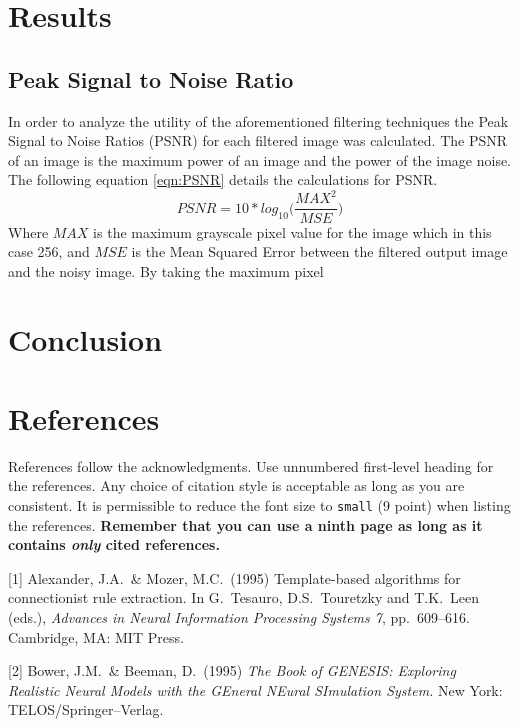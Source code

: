 \documentclass{article}
\begin{document}
\section{Results}
\subsection{Peak Signal to Noise Ratio}
In order to analyze the utility of the aforementioned filtering techniques the Peak Signal to Noise Ratios (PSNR) for each filtered image was calculated. The PSNR of an image is the maximum power of an image and the power of the image noise. The following equation \ref{eqn:PSNR} details the calculations for PSNR.
\begin{equation}\label{eqn:PSNR}
PSNR = 10*log_{10}\Big(\frac{MAX^2}{MSE}\Big)
\end{equation}	 
Where $MAX$ is the maximum grayscale pixel value for the image which in this case 256, and $MSE$ is the Mean Squared Error between the filtered output image and the noisy image. By taking the maximum pixel 
\section{Conclusion}






\section*{References}

References follow the acknowledgments. Use unnumbered first-level
heading for the references. Any choice of citation style is acceptable
as long as you are consistent. It is permissible to reduce the font
size to \verb+small+ (9 point) when listing the references. {\bf
  Remember that you can use a ninth page as long as it contains
  \emph{only} cited references.}
\medskip

\small

[1] Alexander, J.A.\ \& Mozer, M.C.\ (1995) Template-based algorithms
for connectionist rule extraction. In G.\ Tesauro, D.S.\ Touretzky and
T.K.\ Leen (eds.), {\it Advances in Neural Information Processing
  Systems 7}, pp.\ 609--616. Cambridge, MA: MIT Press.

[2] Bower, J.M.\ \& Beeman, D.\ (1995) {\it The Book of GENESIS:
  Exploring Realistic Neural Models with the GEneral NEural SImulation
  System.}  New York: TELOS/Springer--Verlag.
\end{document}

